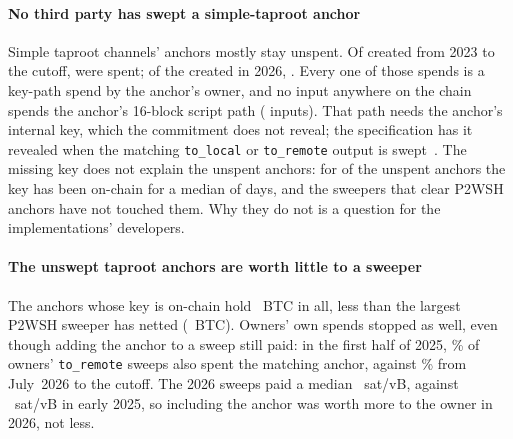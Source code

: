 \paragraph{No third party has swept a simple-taproot anchor}
Simple taproot channels' anchors mostly stay unspent. Of \TaprootAnchors{} created from 2023 to the cutoff,
\TaprootAnchorsSpent{} were spent; of the \TaprootAnchorsTwentySix{} created in 2026, \TaprootAnchorsSpentTwentySix.
Every one of those spends is a key-path spend by the anchor's owner, and no input anywhere on the chain spends the
anchor's 16-block script path (\TaprootScriptPathChainwide{} inputs). That path needs the anchor's internal key,
which the commitment does not reveal; the specification has it revealed when the matching \texttt{to\_local} or
\texttt{to\_remote} output is swept~\cite{boltsimpletaproot}. The missing key does not explain the unspent anchors:
for \TaprootKeyExposedUnspent{} of the \TaprootAnchorsUnspent{} unspent anchors the key has been on-chain for a
median of \TaprootKeyExposedDaysMed{} days, and the sweepers that clear P2WSH anchors have not touched them. Why
they do not is a question for the implementations' developers.

\paragraph{The unswept taproot anchors are worth little to a sweeper}
The anchors whose key is on-chain hold \TaprootKeyPublicBtc~BTC in all, less than the largest P2WSH sweeper has
netted (\SweepLargestNetBtc~BTC). Owners' own spends stopped as well, even though adding the anchor to a sweep still
paid: in the first half of 2025, \TaprootCosweepToRemotePctEarly\% of owners' \texttt{to\_remote} sweeps also spent
the matching anchor, against \TaprootCosweepToRemotePctLate\% from July~2026 to the cutoff. The 2026 sweeps paid a
median \TaprootOwnerSweepFrLate~sat/vB, against \TaprootOwnerSweepFrEarly~sat/vB in early 2025, so including the
anchor was worth more to the owner in 2026, not less.
